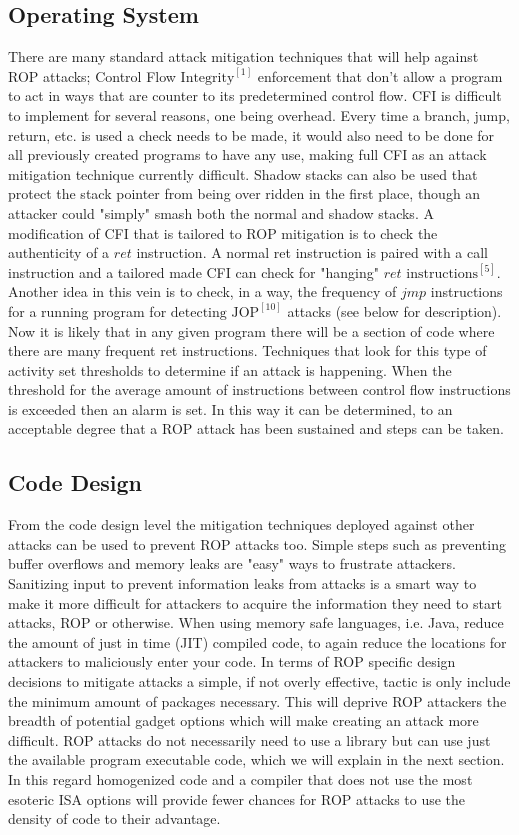 \documentclass[11pt]{amsart}
\begin{document}
\subsection*{Operating System}
There are many standard attack mitigation techniques that will help against ROP attacks; Control Flow $\text{Integrity}^{[1]}$ enforcement that don't allow a program to act in ways that are counter to its predetermined control flow. CFI is difficult to implement for several reasons, one being overhead. Every time a branch, jump, return, etc. is used a check needs to be made, it would also need to be done for all previously created programs to have any use, making full CFI as an attack mitigation technique currently difficult. Shadow stacks can also be used that protect the stack pointer from being over ridden in the first place, though an attacker could "simply" smash both the normal and shadow stacks. \newline \newline
A modification of CFI that is tailored to ROP mitigation is to check the authenticity of a $ret$ instruction. A normal ret instruction is paired with a call instruction and a tailored made CFI can check for "hanging" $ret$ $\text{instructions}^{[5]}$. Another idea in this vein is to check, in a way, the frequency of $jmp$ instructions for a running program for $\text{detecting JOP}^{[10]}$ attacks (see below for description). Now it is likely that in any given program there will be a section of code where there are many frequent ret instructions. Techniques that look for this type of activity set thresholds to determine if an attack is happening. When the threshold for the average amount of instructions between control flow instructions is exceeded then an alarm is set. In this way it can be determined, to an acceptable degree that a ROP attack has been sustained and steps can be taken.
\subsection*{Code Design}
From the code design level the mitigation techniques deployed against other attacks can be used to prevent ROP attacks too. Simple steps such as preventing buffer overflows and memory leaks are "easy" ways to frustrate attackers. Sanitizing input to prevent information leaks from attacks is a smart way to make it more difficult for attackers to acquire the information they need to start attacks, ROP or otherwise. When using memory safe languages, i.e. Java, reduce the amount of just in time (JIT) compiled code, to again reduce the locations for attackers to maliciously enter your code.\newline \newline
In terms of ROP specific design decisions to mitigate attacks a simple, if not overly effective, tactic is only include the minimum amount of packages necessary. This will deprive ROP attackers the breadth of potential gadget options which will make creating an attack more difficult. ROP attacks do not necessarily need to use a library but can use just the available program executable code, which we will explain in the next section. In this regard homogenized code and a compiler that does not use the most esoteric ISA options will provide fewer chances for ROP attacks to use the density of code to their advantage.
\end{document}
